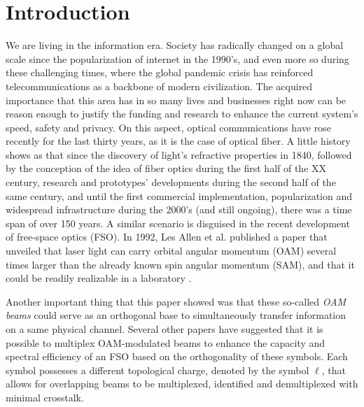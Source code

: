 \chapter{Introduction} 
\label{Introduction} %

We are living in the information era. Society has radically changed on a global scale since the popularization of internet in the 1990's, and even more so during these challenging times, where the global pandemic crisis has reinforced telecommunications as a backbone of modern civilization. The acquired importance that this area has in so many lives and businesses right now can be reason enough to justify the funding and research to enhance the current system's speed, safety and privacy. On this aspect, optical communications have rose recently for the last thirty years, as it is the case of optical fiber. A little history shows as that since the discovery of light's refractive properties in 1840, followed by the conception of the idea of fiber optics during the first half of the XX century, research and prototypes' developments during the second half of the same century, and until the first commercial implementation, popularization and widespread infrastructure during the 2000's (and still ongoing), there was a time span of over 150 years. A similar scenario is disguised in the recent development of free-space optics (FSO). In 1992, Les Allen et al. published a paper that unveiled that laser light can carry orbital angular momentum (OAM) several times larger than the already known spin angular momentum (SAM), and that it could be readily realizable in a laboratory \cite{Allen_OAM:1992}. 

Another important thing that this paper showed was that these so-called \textit{OAM beams} could serve as an orthogonal base to simultaneously transfer information on a same physical channel. Several other papers \cite{Ren:13} \cite{Gibson:04} \cite{Funes:17} have suggested that it is possible to multiplex OAM-modulated beams to enhance the capacity and spectral efficiency of an FSO based on the orthogonality of these symbols. Each symbol possesses a different topological charge, denoted by the symbol $\ell$, that allows for overlapping beams to be multiplexed, identified and demultiplexed with minimal crosstalk.

